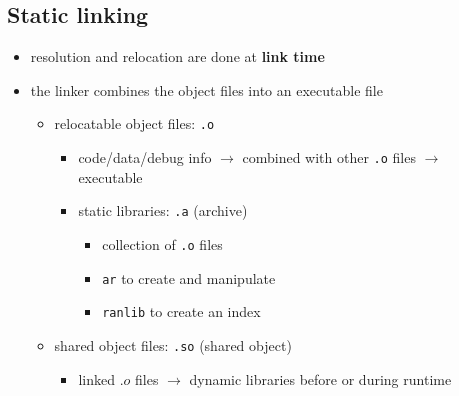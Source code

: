 \documentclass[letterpaper,12pt]{article}
\begin{document}
\subsection{Static linking}
\begin{itemize}
    \item resolution and relocation are done at \textbf{link time}
    \item the linker combines the object files into an executable file\begin{itemize}
        \item relocatable object files: \texttt{.o}\begin{itemize}
            \item code/data/debug info $\to$ combined with other \texttt{.o} files $\to$ executable
            \item static libraries: \texttt{.a} (archive)\begin{itemize}
                \item collection of \texttt{.o} files
                \item \texttt{ar} to create and manipulate
                \item \texttt{ranlib} to create an index
                \end{itemize}
            
        \end{itemize}
        \item shared object files: \texttt{.so} (shared object)\begin{itemize}
            \item linked $.o$ files $\to$ dynamic libraries before or during runtime
            \end{itemize}
    \end{itemize}
\end{itemize}
\end{document}
